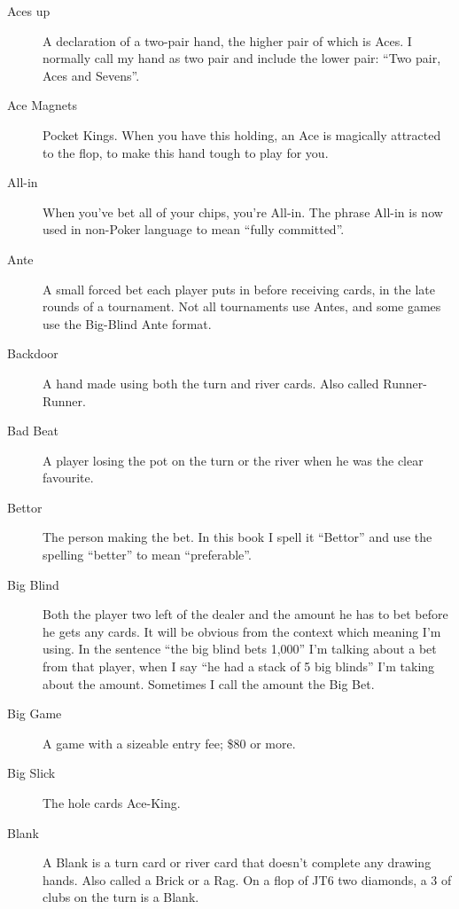 \begin{description}

\item[Aces up] A declaration of a two-pair hand, the higher pair of
which is Aces. I normally call my hand as two pair and include the
lower pair: ``Two pair, Aces and Sevens''.

\item[Ace Magnets] Pocket Kings. When you have this holding, an Ace is
magically attracted to the flop, to make this hand tough to play for
you.

\item[All-in] When you've bet all of your chips, you're All-in. The
phrase All-in is now used in non-Poker language to mean ``fully
committed''.

\item[Ante] A small forced bet each player puts in before receiving
cards, in the late rounds of a tournament. Not all tournaments use
Antes, and some games use the Big-Blind Ante format.

\item[Backdoor] A hand made using both the turn and river cards. Also
called Runner-Runner.

\item[Bad Beat] A player losing the pot on the turn or the river when
he was the clear favourite.

\item[Bettor] The person making the bet. In this book I spell it ``Bettor''
and use the spelling ``better'' to mean ``preferable''.

\item[Big Blind] Both the player two left of the dealer and the amount
he has to bet before he gets any cards. It will be obvious from the
context which meaning I'm using. In the sentence ``the big blind bets
1,000'' I'm talking about a bet from that player, when I say ``he had
a stack of 5 big blinds'' I'm taking about the amount. Sometimes I
call the amount the Big Bet.

\item[Big Game] A game with a sizeable entry fee; \$80 or more.

\item[Big Slick] The hole cards Ace-King.

\item[Blank] A Blank is a turn card or river card that doesn't
complete any drawing hands. Also called a Brick or a Rag. On a flop of
JT6 two diamonds, a 3 of clubs on the turn is a Blank.


\end{description}
